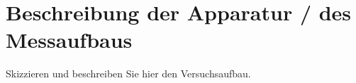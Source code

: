 \section{Beschreibung der Apparatur / des Messaufbaus}
Skizzieren und beschreiben Sie hier den Versuchsaufbau.